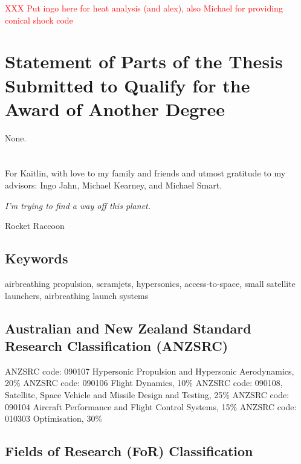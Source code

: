 \textcolor{red}{XXX Put ingo here for heat analysis (and alex), also Michael for providing conical shock code}

\section*{Statement of Parts of the Thesis Submitted to Qualify for the Award of Another Degree}

None.

\clearpage

\section*{} 
  For Kaitlin, with love to my family and friends and utmost gratitude to my advisors: Ingo Jahn, Michael Kearney, and Michael Smart. 

      \vspace*{\fill}
\begin{flushright}
	\textit{I'm trying to find a way off this planet.}
	
Rocket Raccoon
\end{flushright}
\clearpage
\subsection*{Keywords}
  airbreathing propulsion, scramjets, hypersonics, access-to-space, small satellite launchers, airbreathing launch systems

\subsection*{Australian and New Zealand Standard Research Classification (ANZSRC)}

  ANZSRC code: 090107 Hypersonic Propulsion and Hypersonic Aerodynamics, 20\% \newline
 ANZSRC code: 090106 Flight Dynamics, 10\% \newline
 ANZSRC code: 090108, Satellite, Space Vehicle and Missile Design and Testing, 25\% \newline
ANZSRC code: 090104 Aircraft Performance and Flight Control Systems, 15\% \newline
ANZSRC code: 010303 Optimisation, 30\% \newline

\subsection*{Fields of Research (FoR) Classification}

